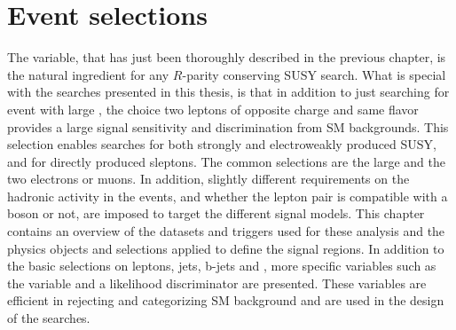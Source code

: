 \chapter{Event selections}\label{sec:eventSelection}
\noindent\justify
The \ptmiss variable, that has just been thoroughly described in the previous chapter, is the natural ingredient for any $R$-parity conserving SUSY search. 
What is special with the searches presented in this thesis, is that in addition to just searching for event with large \ptmiss, the choice two leptons of opposite charge and same flavor provides a large signal sensitivity and discrimination from SM backgrounds.  
This selection enables searches for both strongly and electroweakly produced SUSY, and for directly produced sleptons. 
The common selections are the large \ptmiss and the two electrons or muons. 
In addition, slightly different requirements on the hadronic activity in the events, and whether the lepton pair is compatible with a \PZ boson or not, are imposed to target the different signal models.  
\newpara
\noindent\justify
This chapter contains an overview of the datasets and triggers used for these analysis and the physics objects and selections applied to define the signal regions.
In addition to the basic selections on leptons, jets, b-jets and \ptmiss, more specific variables such as the \mttwo variable and a \ttbar likelihood discriminator are presented.
These variables are efficient in rejecting and categorizing SM background and are used in the design of the searches.   
\newpage
